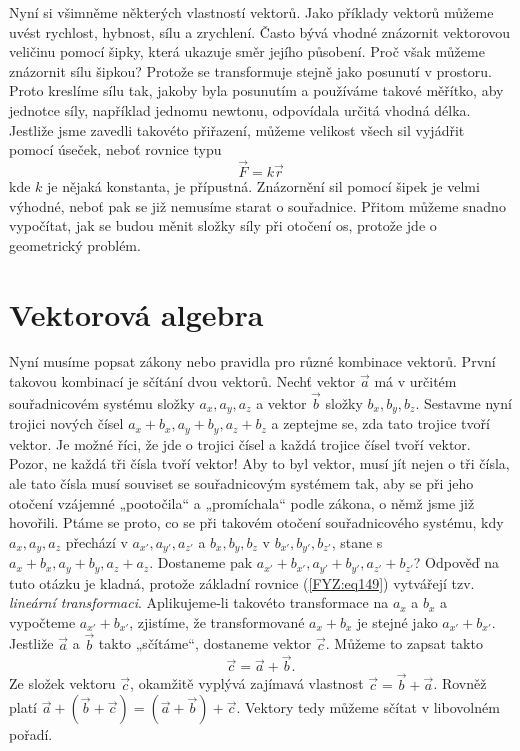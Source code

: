 {    Nyní si všimněme některých vlastností vektorů. Jako příklady vektorů můžeme uvést rychlost, 
    hybnost, sílu a zrychlení. Často bývá vhodné znázornit vektorovou veličinu pomocí šipky, která 
    ukazuje směr jejího působení. Proč však můžeme znázornit sílu šipkou? Protože se transformuje 
    stejně jako posunutí v prostoru. Proto kreslíme sílu tak, jakoby byla posunutím a používáme 
    takové měřítko, aby jednotce síly, například jednomu newtonu, odpovídala určitá vhodná délka. 
    Jestliže jsme zavedli takovéto přiřazení, můžeme velikost všech sil vyjádřit pomocí úseček, 
    neboť rovnice typu
    \begin{equation*}
     \vec{F} = k\vec{r}
    \end{equation*}
    kde \(k\) je nějaká konstanta, je přípustná. Znázornění sil pomocí šipek je velmi výhodné, 
    neboť pak se již nemusíme starat o souřadnice. Přitom můžeme snadno vypočítat, jak se budou 
    měnit složky síly při otočení os, protože jde o geometrický problém.
    
  \section{Vektorová algebra}
    Nyní musíme popsat zákony nebo pravidla pro různé kombinace vektorů. První takovou kombinací je 
    sčítání dvou vektorů. Nechť vektor \(\vec{a}\) má v určitém souřadnicovém systému složky \(a_x, 
    a_y, a_z\) a vektor \(\vec{b}\) složky \(b_x, b_y, b_z\). Sestavme nyní trojici nových čísel 
    \(a_x + b_x, a_y + b_y, a_z + b_z\) a zeptejme se, zda tato trojice tvoří vektor. Je možné 
    říci, že jde o trojici čísel a každá trojice čísel tvoří vektor. Pozor, ne každá tři čísla 
    tvoří vektor! Aby to byl vektor, musí jít nejen o tři čísla, ale tato čísla musí souviset se 
    souřadnicovým systémem tak, aby se při jeho otočení vzájemné „pootočila“ a „promíchala“ podle 
    zákona, o němž jsme již hovořili. Ptáme se proto, co se při takovém otočení souřadnicového 
    systému, kdy \(a_x, a_y, a_z\) přechází v \(a_{x'}, a_{y'}, a_{z'}\) a \(b_x, b_y, b_z\) v 
    \(b_{x'}, b_{y'}, b_{z'}\), stane s \(a_x + b_x, a_y + b_y, a_z + a_z\). Dostaneme pak \(a_{x'} 
    + b_{x'}, a_{y'} + b_{y'}, a_{z'} + b_{z'}\)? Odpověď na tuto otázku je kladná, protože 
    základní rovnice (\ref{FYZ:eq149}) vytvářejí tzv. \emph{lineární transformaci}. Aplikujeme-li 
    takovéto transformace na \(a_x\) a \(b_x\) a vypočteme \(a_{x'} + b_{x'}\), zjistíme, že 
    transformované \(a_x + b_x\) je stejné jako \(a_{x'} + b_{x'}\). Jestliže \(\vec{a}\) a 
    \(\vec{b}\) takto „sčítáme“, dostaneme vektor \(\vec{c}\). Můžeme to zapsat takto
    \begin{equation*}
     \vec{c} = \vec{a} + \vec{b}.
    \end{equation*}
    Ze složek vektoru \(\vec{c}\), okamžitě vyplývá zajímavá vlastnost \(\vec{c} = \vec{b} + 
    \vec{a}\). Rovněž platí \(\vec{a} + (\vec{b} + \vec{c}) = (\vec{a} + \vec{b}) + \vec{c}\). 
    Vektory tedy můžeme sčítat v libovolném pořadí.
    
}
